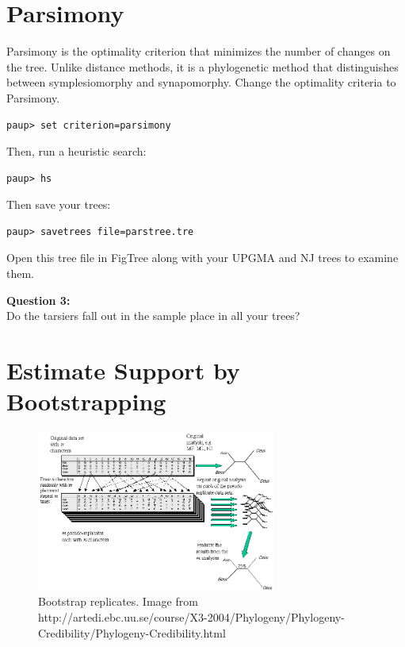 \documentclass[11pt]{article}
\begin{document}
\section{Parsimony}

Parsimony is the optimality criterion that minimizes the number of changes on the tree. Unlike distance methods, it is a phylogenetic method that distinguishes between symplesiomorphy and synapomorphy. Change the optimality criteria to Parsimony.

\begin{verbatim}
paup> set criterion=parsimony
\end{verbatim}

Then, run a heuristic search:

\begin{verbatim}
paup> hs
\end{verbatim}

Then save your trees:

\begin{verbatim}
paup> savetrees file=parstree.tre
\end{verbatim}

Open this tree file in FigTree along with your UPGMA and NJ trees to examine them.

\begin{framed}
\noindent
\textbf{Question 3:} \\
Do the tarsiers fall out in the sample place in all your trees?
\end{framed}

\section{Estimate Support by Bootstrapping}

\begin{figure}
\centering
\includegraphics[width=0.7\textwidth]{bootstrap.png}
\caption{Bootstrap replicates. Image from \\ http://artedi.ebc.uu.se/course/X3-2004/Phylogeny/Phylogeny-Credibility/Phylogeny-Credibility.html}
\end{figure}
\end{document}
